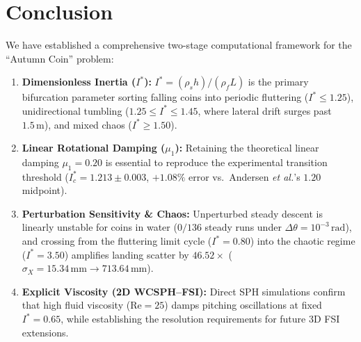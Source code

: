 \documentclass[10pt,a4paper,twocolumn]{article}
\begin{document}
\section{Conclusion}
We have established a comprehensive two-stage computational framework for the ``Autumn Coin'' problem:
\begin{enumerate}
    \item \textbf{Dimensionless Inertia ($I^*$):} $I^* = (\rho_s h)/(\rho_f L)$ is the primary bifurcation parameter sorting falling coins into periodic fluttering ($I^* \le 1.25$), unidirectional tumbling ($1.25 \le I^* \le 1.45$, where lateral drift surges past $1.5\,\mathrm{m}$), and mixed chaos ($I^* \ge 1.50$).
    \item \textbf{Linear Rotational Damping ($\mu_1$):} Retaining the theoretical linear damping $\mu_1 = 0.20$ is essential to reproduce the experimental transition threshold ($I^*_c = 1.213 \pm 0.003$, $+1.08\%$ error vs.\ Andersen \textit{et al.}'s $1.20$ midpoint).
    \item \textbf{Perturbation Sensitivity \& Chaos:} Unperturbed steady descent is linearly unstable for coins in water ($0/136$ steady runs under $\Delta\theta = 10^{-3}\,\mathrm{rad}$), and crossing from the fluttering limit cycle ($I^* = 0.80$) into the chaotic regime ($I^* = 3.50$) amplifies landing scatter by $46.52\times$ ($\sigma_X = 15.34\,\mathrm{mm} \to 713.64\,\mathrm{mm}$).
    \item \textbf{Explicit Viscosity (2D WCSPH--FSI):} Direct SPH simulations confirm that high fluid viscosity ($\mathrm{Re} = 25$) damps pitching oscillations at fixed $I^* = 0.65$, while establishing the resolution requirements for future 3D FSI extensions.
\end{enumerate}
\end{document}

